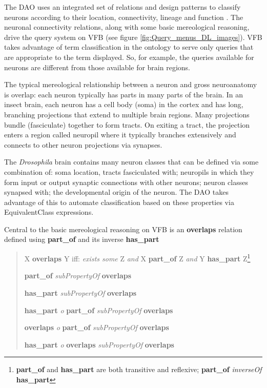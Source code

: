 \documentclass[runningheads,a4paper]{llncs}
\begin{document}
The DAO uses an integrated set of relations and design patterns to
classify neurons according to their location, connectivity, lineage
and function \cite{pmid22180411,pmid22402613}.  The neuronal
connectivity relations, along with some basic mereological reasoning,
drive the query system on VFB (see figure
\ref{fig:Query_menus_DL_images}). VFB takes advantage of term
classification in the ontology to serve only queries that are
appropriate to the term displayed. So, for example, the queries
available for neurons are different from those available for brain regions.

The typical mereological relationship between a neuron and gross
neuroanatomy is overlap:  each neuron typically has parts in many
parts of the brain.  In an insect brain, each neuron has a cell body
(soma) in the cortex and has long, branching projections that extend
to multiple brain regions.  Many projections bundle (fasciculate)
together to form tracts.  On exiting a tract, the projection enters a
region called neuropil where it typically branches extensively and
connects to other neuron projections via synapses.

The \textit{Drosophila} brain contains many neuron classes that can be
defined via some combination of: soma location, tracts fasciculated
with; neuropils in which they form input or output synaptic
connections with other neurons; neuron classes synapsed with; the
developmental origin of the neuron.  The DAO takes advantage of this
to automate classification based on these properties via
EquivalentClass expressions.

Central to the basic mereological reasoning on VFB is an
\textbf{overlaps} relation defined using \textbf{part\_of} and its
inverse \textbf{has\_part} 

\begin{quote}
X \textbf{overlaps} Y iff: \textit{exists some} Z \textit{and}
X \textbf{part\_of} Z \textit{and} Y \textbf{has\_part}
Z\footnote{\textbf{part\_of} and \textbf{has\_part} are both
  transitive and reflexive; \textbf{part\_of} \textit{inverseOf}
  \textbf{has\_part}}

\textbf{part\_of} \textit{subPropertyOf}
  \textbf{overlaps}

\textbf{has\_part} \textit{subPropertyOf} \textbf{overlaps}

\textbf{has\_part} \textit{o} \textbf{part\_of} \textit{subPropertyOf}
\textbf{overlaps}

\textbf{overlaps} \textit{o} \textbf{part\_of} \textit{subPropertyOf} \textbf{overlaps}

\textbf{has\_part} \textit{o} \textbf{overlaps} \textit{subPropertyOf} \textbf{overlaps}\end{quote}
\end{document}
